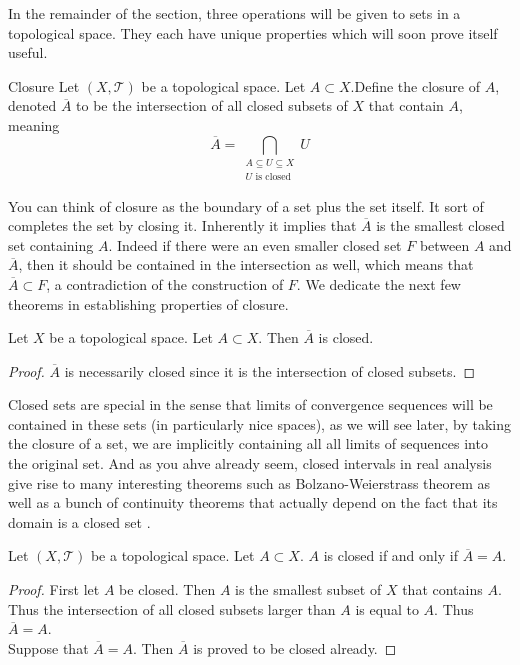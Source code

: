 \documentclass[a4paper]{article}
\begin{document}
In the remainder of the section, three operations will be given to sets in a topological space. They each have unique properties which will soon prove itself useful. 

\begin{defn}{Closure}{} Let $(X,\mathcal{T})$ be a topological space. Let $A\subset X$.Define the closure of $A$, denoted $\overline{A}$ to be the intersection of all closed subsets of $X$ that contain $A$, meaning $$\overline{A}=\bigcap_{\substack{A\subseteq U\subseteq X\\U\text{ is closed}}}U$$
\end{defn}

You can think of closure as the boundary of a set plus the set itself.  It sort of completes the set by closing it. Inherently it implies that $\overline{A}$ is the smallest closed set containing $A$. Indeed if there were an even smaller closed set $F$ between $A$ and $\overline{A}$, then it should be contained in the intersection as well, which means that $\overline{A}\subset F$, a contradiction of the construction of $F$. We dedicate the next few theorems in establishing properties of closure. 

\begin{lmm}{}{} Let $X$ be a topological space. Let $A\subset X$. Then $\overline{A}$ is closed. 
\begin{proof}
$\overline{A}$ is necessarily closed since it is the intersection of closed subsets. 
\end{proof}
\end{lmm}

Closed sets are special in the sense that limits of convergence sequences will be contained in these sets (in particularly nice spaces), as we will see later, by taking the closure of a set, we are implicitly containing all all limits of sequences into the original set. And as you ahve already seem, closed intervals in real analysis give rise to many interesting theorems such as Bolzano-Weierstrass theorem as well as a bunch of continuity theorems that actually depend on the fact that its domain is a closed set . 

\begin{prp}{}{} Let $(X,\mathcal{T})$ be a topological space. Let $A\subset X$. $A$ is closed if and only if $\overline{A}=A$. 
\begin{proof}
First let $A$ be closed. Then $A$ is the smallest subset of $X$ that contains $A$. Thus the intersection of all closed subsets larger than $A$ is equal to $A$. Thus $\overline{A}=A$. \\
Suppose that $\overline{A}=A$. Then $\overline{A}$ is proved to be closed already. 
\end{proof}
\end{prp}
\end{document}
